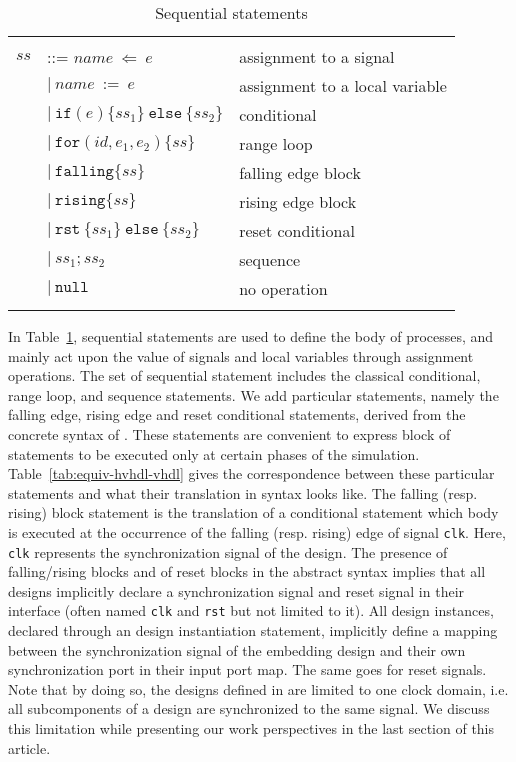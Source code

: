 \begin{table}[!t]
  \caption{Sequential statements}
  \label{tab:ss}
  \begin{tabular}{|rll|}
    \hline
    & & \\
    $ss$ & ::= $name~\mathtt{\Leftarrow}~e$ & assignment to a signal \\
    & \quad$\vert{}~name~\mathtt{:=}~e$ & assignment to a local variable \\
    & \quad$\vert{}~\mathtt{if}(e)\{ss_1\}~\mathtt{else}~\{ss_2\}$ & conditional \\
    & \quad$\vert{}~\mathtt{for}(id,e_1,e_2)\{ss\}$ & range loop \\
    & \quad$\vert{}~\mathtt{falling}\{ss\}$ & falling edge block \\
    & \quad$\vert{}~\mathtt{rising}\{ss\}$ & rising edge block \\
    & \quad$\vert{}~\mathtt{rst}~\{ss_1\}~\mathtt{else}~\{ss_2\}$ & reset conditional \\
    & \quad$\vert{}~ss_1\mathtt{;}ss_2$ & sequence \\
    & \quad$\vert{}~\mathtt{null}$ & no operation \\
    & & \\
    \hline
  \end{tabular}
\end{table}

In Table~\ref{tab:ss}, sequential statements are used to define the
body of processes, and mainly act upon the value of signals and local
variables through assignment operations. The set of sequential
statement includes the classical conditional, range loop, and sequence
statements. We add particular statements, namely the falling edge,
rising edge and reset conditional statements, derived from the
concrete syntax of \vhdl{}.  These statements are convenient to
express block of statements to be executed only at certain phases of
the simulation. Table~\ref{tab:equiv-hvhdl-vhdl} gives the
correspondence between these particular \hvhdl{} statements and what
their translation in \vhdl{} syntax looks like. The falling
(resp. rising) block statement is the translation of a conditional
statement which body is executed at the occurrence of the falling
(resp. rising) edge of signal \texttt{clk}. Here, \texttt{clk}
represents the synchronization signal of the design. The presence of
falling/rising blocks and of reset blocks in the \hvhdl{} abstract
syntax implies that all \hvhdl{} designs implicitly declare a
synchronization signal and reset signal in their interface (often
named \texttt{clk} and \texttt{rst} but not limited to it). All design
instances, declared through an design instantiation statement,
implicitly define a mapping between the synchronization signal of the
embedding design and their own synchronization port in their input
port map. The same goes for reset signals. Note that by doing so, the
designs defined in \hvhdl{} are limited to one clock domain, i.e. all
subcomponents of a design are synchronized to the same signal. We
discuss this limitation while presenting our work perspectives in the
last section of this article.

